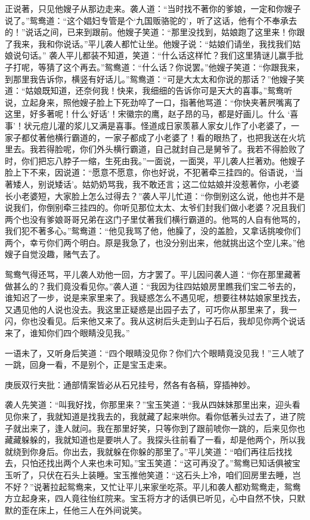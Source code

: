 \begin{parag}
    正说著，只见他嫂子从那边走来。袭人道：“当时找不著你的爹娘，一定和你嫂子说了。”鸳鸯道：“这个娼妇专管是个‘九国贩骆驼的’，听了这话，他有个不奉承去的！”说话之间，已来到跟前。他嫂子笑道：“那里没找到，姑娘跑了这里来！你跟了我来，我和你说话。”平儿袭人都忙让坐。他嫂子说：“姑娘们请坐，我找我们姑娘说句话。” 袭人平儿都装不知道，笑道：“什么话这样忙？我们这里猜谜儿赢手批子打呢，等猜了这个再去。”鸳鸯道：“什么话？你说罢。”他嫂子笑道：“你跟我来，到那里我告诉你，横竖有好话儿。”鸳鸯道：“可是大太太和你说的那话？”他嫂子笑道：“姑娘既知道，还奈何我！快来，我细细的告诉你可是天大的喜事。”鸳鸯听说，立起身来，照他嫂子脸上下死劲啐了一口，指著他骂道：“你快夹著屄嘴离了这里，好多著呢！什么‘好话’！宋徽宗的鹰，赵子昂的马，都是好画儿。什么 ‘喜事’！状元痘儿灌的浆儿又满是喜事。怪道成日家羡慕人家女儿作了小老婆了，一家子都仗著他横行霸道的，一家子都成了小老婆了！看的眼热了，也把我送在火坑里去。我若得脸呢，你们外头横行霸道，自己就封自己是舅爷了。我若不得脸败了时，你们把忘八脖子一缩，生死由我。”一面说，一面哭，平儿袭人拦著劝。他嫂子脸上下不来，因说道：“愿意不愿意，你也好说，不犯著牵三挂四的。俗语说，‘当著矮人，别说矮话’。姑奶奶骂我，我不敢还言；这二位姑娘并没惹著你，小老婆长小老婆短，大家脸上怎么过得去？”袭人平儿忙道：“你倒别这么说，他也并不是说我们，你倒别牵三挂四的。你听见那位太太、太爷们封我们做小老婆？况且我们两个也没有爹娘哥哥兄弟在这门子里仗著我们横行霸道的。他骂的人自有他骂的，我们犯不著多心。”鸳鸯道：“他见我骂了他，他臊了，没的盖脸，又拿话挑唆你们两个，幸亏你们两个明白。原是我急了，也没分别出来，他就挑出这个空儿来。”他嫂子自觉没趣，赌气去了。
\end{parag}


\begin{parag}
    鸳鸯气得还骂，平儿袭人劝他一回，方才罢了。平儿因问袭人道：“你在那里藏著做甚么的？我们竟没看见你。”袭人道：“我因为往四姑娘房里瞧我们宝二爷去的，谁知迟了一步，说是来家里来了。我疑惑怎么不遇见呢，想要往林姑娘家里找去，又遇见他的人说也没去。我这里正疑惑是出园子去了，可巧你从那里来了，我一闪，你也没看见。后来他又来了。我从这树后头走到山子石后，我却见你两个说话来了，谁知你们四个眼睛没见我。”
\end{parag}


\begin{parag}
    一语未了，又听身后笑道：“四个眼睛没见你？你们六个眼睛竟没见我！”三人唬了一跳，回身一看，不是别个，正是宝玉走来。\begin{note}庚辰双行夹批：通部情案皆必从石兄挂号，然各有各稿，穿插神妙。\end{note}袭人先笑道：“叫我好找，你那里来？”宝玉笑道：“我从四妹妹那里出来，迎头看见你来了，我就知道是找我去的，我就藏了起来哄你。看你低著头过去了，进了院子就出来了，逢人就问。我在那里好笑，只等你到了跟前唬你一跳的，后来见你也藏藏躲躲的，我就知道也是要哄人了。我探头往前看了一看，却是他两个，所以我就绕到你身后。你出去，我就躲在你躲的那里了。”平儿笑道：“咱们再往后找找去，只怕还找出两个人来也未可知。”宝玉笑道：“这可再没了。”鸳鸯已知话俱被宝玉听了，只伏在石头上装睡。宝玉推他笑道：“这石头上冷，咱们回房里去睡，岂不好？”说著拉起鸳鸯来，又忙让平儿来家坐吃茶。平儿和袭人都劝鸳鸯走，鸳鸯方立起身来，四人竟往怡红院来。宝玉将方才的话俱已听见，心中自然不快，只默默的歪在床上，任他三人在外间说笑。
\end{parag}


